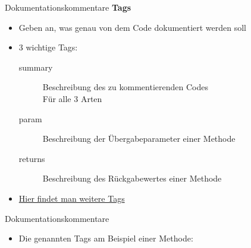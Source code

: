 \begin{frame}{Dokumentationskommentare}
	\textbf{Tags}
	\begin{itemize}
		\item Geben an, was genau von dem Code dokumentiert werden soll
		\item 3 wichtige Tags:
		\begin{description}
			\item[summary] Beschreibung des zu kommentierenden Codes\\ Für alle 3 Arten
			\item[param] Beschreibung der Übergabeparameter einer Methode
			\item[returns] Beschreibung des Rückgabewertes einer Methode
		\end{description}
		\item \href{https://msdn.microsoft.com/de-de/library/5ast78ax.aspx}{Hier findet man weitere Tags}
	\end{itemize}
\end{frame}

\begin{frame}{Dokumentationskommentare}
	\begin{itemize}
		\item Die genannten Tags am Beispiel einer Methode:
	\end{itemize}
		
\end{frame}


